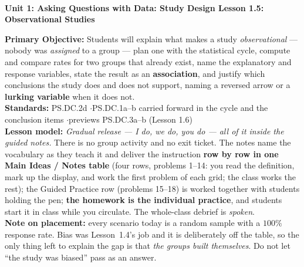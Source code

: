 \documentclass[10pt]{article}
\newcommand{\UnitNumberName}{Unit 1: Asking Questions with Data: Study Design \quad}
\newcommand{\LessonNumberName}{Lesson 1.5: Observational Studies}
\begin{document}
\begin{center}
    {\Large\bfseries \CourseName \\
    {\small\bfseries \UnitNumberName \LessonNumberName}}
\end{center}

\begin{tcolorbox}[colback=frost, colframe=cerulean, boxrule=0.9pt, arc=2mm,
    left=2mm, right=2mm, top=1.5mm, bottom=1.5mm]
    \textbf{Primary Objective:} Students will explain what makes a study \emph{observational}
    --- nobody was \emph{assigned} to a group --- plan one with the statistical cycle, compute
    and compare rates for two groups that already exist, name the explanatory and response
    variables, state the result as an \textbf{association}, and justify which conclusions the
    study does and does not support, naming a reversed arrow or a \textbf{lurking variable}
    when it does not.
    \\[2pt]
    \textbf{Standards:} PS.DC.2d \quad$\cdot$\quad PS.DC.1a--b carried forward in the cycle and
    the conclusion items \quad$\cdot$\quad previews PS.DC.3a--b (Lesson 1.6)
    \\[2pt]
    \textbf{Lesson model:} \emph{Gradual release --- I do, we do, you do --- all of it inside
    the guided notes.} There is no group activity and no exit ticket. The notes name the
    vocabulary as they teach it and deliver the instruction \textbf{row by row in one Main
    Ideas / Notes table} (four rows, problems 1--14: you read the definition, mark up the
    display, and work the first problem of each grid; the class works the rest); the Guided
    Practice row (problems 15--18) is worked together with students holding the pen;
    \textbf{the homework is the individual practice}, and students start it in class while you
    circulate. The whole-class debrief is \emph{spoken}.
    \\[2pt]
    \textbf{Note on placement:} every scenario today is a random sample with a $100\%$
    response rate. Bias was Lesson~1.4's job and it is deliberately off the table, so the only
    thing left to explain the gap is that \emph{the groups built themselves}. Do not let
    ``the study was biased'' pass as an answer.
\end{tcolorbox}
\end{document}
